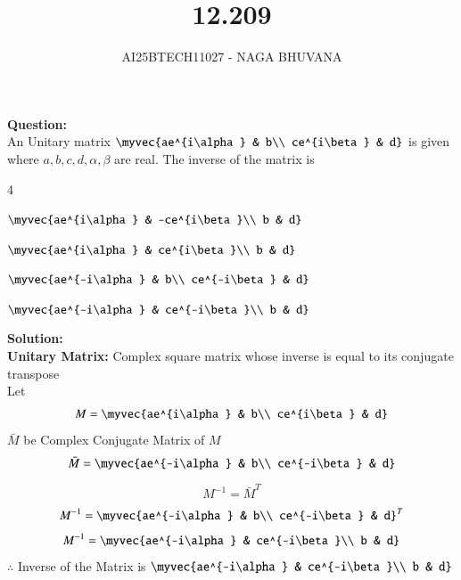\documentclass[journal,12pt,onecolumn]{IEEEtran}
\begin{document}
\title{12.209}
\author{AI25BTECH11027 - NAGA BHUVANA}
{\let\newpage\relax\maketitle}
\noindent
		\textbf{Question:}\\
An Unitary matrix   $\myvec{ae^{i\alpha} & b\\ ce^{i\beta} & d}$ is given where $a,b,c,d,\alpha,\beta$ are real. The inverse of the matrix is\\
\begin{enumerate}
\begin{multicols}{4}
    \item $\myvec{ae^{i\alpha} & -ce^{i\beta}\\ b & d}$ 
    \item $\myvec{ae^{i\alpha} & ce^{i\beta}\\ b & d}$ 
    \item $\myvec{ae^{-i\alpha} & b\\ ce^{-i\beta} & d}$ 
    \item $\myvec{ae^{-i\alpha} & ce^{-i\beta}\\ b & d}$ 
    \end{multicols}
\end{enumerate}
\textbf{Solution:}\\
\textbf{Unitary Matrix:} Complex square matrix whose inverse is equal to its conjugate transpose\\
Let \begin{align}
    M=\myvec{ae^{i\alpha} & b\\ ce^{i\beta} & d}
\end{align}
$\bar{M}$ be Complex Conjugate Matrix of $M$\\
\begin{align}
    \bar{M}=\myvec{ae^{-i\alpha} & b\\ ce^{-i\beta} & d}
\end{align}
\begin{align}
    M^{-1}=\bar{M}^{T}
\end{align}
\begin{align}
    M^{-1}=\myvec{ae^{-i\alpha} & b\\ ce^{-i\beta} & d}^T
\end{align}
\begin{align}
    M^{-1}=\myvec{ae^{-i\alpha} & ce^{-i\beta}\\ b & d}
\end{align}
$\therefore$ Inverse of the Matrix is $\myvec{ae^{-i\alpha} & ce^{-i\beta}\\ b & d}$
        
\end{document}
